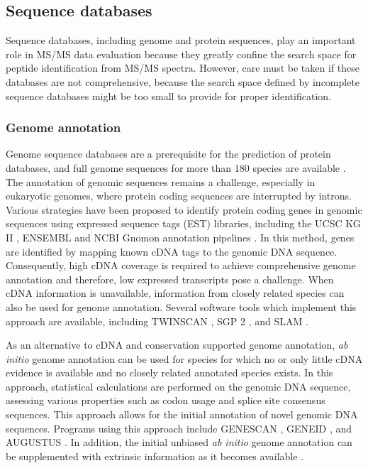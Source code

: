 \subsection{Sequence databases}

Sequence databases, including genome and protein sequences, play an important
role in MS/MS data evaluation because they greatly confine the search space
for peptide identification from MS/MS spectra.
However, care must be taken if these databases are not comprehensive, because
the search space defined by incomplete sequence databases might be too small
to provide for proper identification.

\subsubsection{Genome annotation}

Genome sequence databases are a prerequisite for the prediction of protein 
databases, and full genome sequences for more than 180 species are available
\citep{Yates2009}.
The annotation of genomic sequences remains a challenge, especially in
eukaryotic genomes, where protein coding sequences are interrupted by
introns.
Various strategies have been proposed to identify protein coding genes in
genomic sequences using expressed sequence tags (EST) libraries, 
including the UCSC KG II \citep{Karolchik2003}, ENSEMBL \citep{Hubbard2005} 
and NCBI Gnomon annotation pipelines \citep{Maglott2005}.
In this method, genes are identified by mapping known cDNA tags to the
genomic DNA sequence.
Consequently, high cDNA coverage is required to achieve comprehensive
genome annotation and therefore, low expressed transcripts pose a challenge.
When cDNA information is unavailable, information from closely related
species can also be used for genome annotation.
Several software tools which implement this approach are available,
including TWINSCAN \citep{Korf2001}, SGP 2 \citep{Parra2003}, and 
SLAM \citep{Cawley2003}.

As an alternative to cDNA and conservation supported genome annotation,
{\em ab initio} genome annotation can be used for species for which no
or only little cDNA evidence is available and no closely related annotated
species exists.
In this approach, statistical calculations are performed on the genomic
DNA sequence, assessing various properties such as codon usage and splice 
site consensus sequences.
This approach allows for the initial annotation of novel genomic DNA 
sequences.
Programs using this approach include GENESCAN \citep{Burge1997}, 
GENEID \citep{Parra2000}, and AUGUSTUS \citep{Stanke2004, Stanke2006}.
In addition, the initial unbiased {\em ab initio} genome annotation can be 
supplemented with extrinsic information as it becomes available 
\citep{Stanke2008}.

